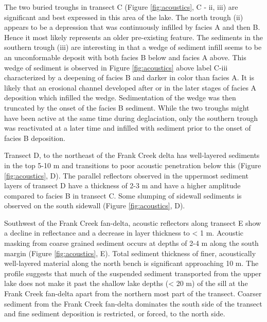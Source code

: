 \documentclass[Royal,times,doublespace,sageh]{sagej}
\begin{document}
The two buried troughs in transect C (Figure \ref{fig:acoustics}, C -
ii, iii) are significant and best expressed in this area of the lake.
The north trough (ii) appears to be a depression that was continuously
infilled by facies A and then B. Hence it most likely represents an
older pre-existing feature. The sediments in the southern trough (iii)
are interesting in that a wedge of sediment infill seems to be an
unconformable deposit with both facies B below and facies A above. This
wedge of sediment is observed in Figure \ref{fig:acoustics} above label
C-iii characterized by a deepening of facies B and darker in color than
facies A. It is likely that an erosional channel developed after or in
the later stages of facies A deposition which infilled the wedge.
Sedimentation of the wedge was then truncated by the onset of the facies
B sediment. While the two troughs might have been active at the same
time during deglaciation, only the southern trough was reactivated at a
later time and infilled with sediment prior to the onset of facies B
deposition.

Transect D, to the northeast of the Frank Creek delta has well-layered
sediments in the top 5-10 m and transitions to poor acoustic penetration
below this (Figure \ref{fig:acoustics}, D). The parallel reflectors
observed in the uppermost sediment layers of transect D have a thickness
of 2-3 m and have a higher amplitude compared to facies B in transect C.
Some slumping of sidewall sediments is observed on the south sidewall
(Figure \ref{fig:acoustics}, D).

Southwest of the Frank Creek fan-delta, acoustic reflectors along
transect E show a decline in reflectance and a decrease in layer
thickness to \textless{} 1 m. Acoustic masking from coarse grained
sediment occurs at depths of 2-4 m along the south margin (Figure
\ref{fig:acoustics}, E). Total sediment thickness of finer, acoustically
well-layered material along the north bench is significant approaching
10 m. The profile suggests that much of the suspended sediment
transported from the upper lake does not make it past the shallow lake
depths (\textless{} 20 m) of the sill at the Frank Creek fan-delta apart
from the northern most part of the transect. Coarser sediment from the
Frank Creek fan-delta dominates the south side of the transect and fine
sediment deposition is restricted, or forced, to the north side.
\end{document}

